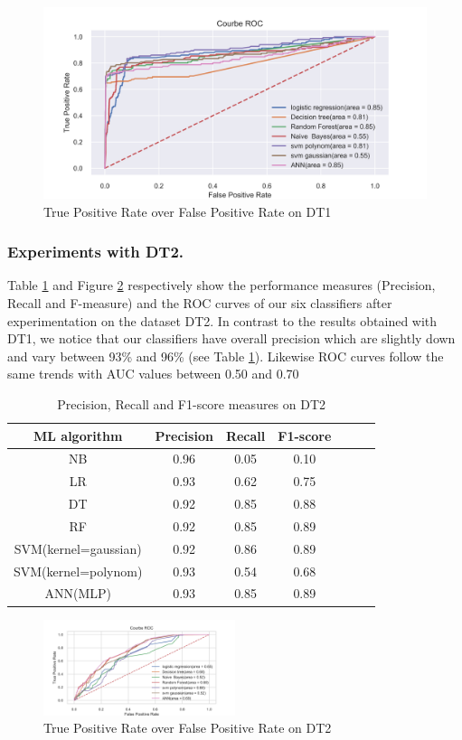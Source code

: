 \begin{figure}[!ht]
\centering
\includegraphics[width=.5\textwidth]{ROCmg}
\caption{True Positive Rate over False Positive Rate on DT1}\label{curve_roc_dt1}
\end{figure}

\subsubsection*{\bf Experiments with DT2.}
Table \ref{perf-measure-dt2} and Figure \ref{curve_roc_dt2} respectively show the performance measures (Precision, Recall and F-measure) and the ROC curves of our six classifiers after experimentation on the dataset DT2. In contrast to the results obtained with DT1, we notice that our classifiers have overall precision which are slightly down and vary between 93\% and 96\% (see Table \ref{perf-measure-dt2}). Likewise ROC curves follow the same trends with AUC values between 0.50 and 0.70

\begin{table}[!ht]
\centering
\begin{tabular}{*{5}{c}l r}
  \toprule
  \textbf{ML algorithm} & \textbf{Precision} & \textbf{Recall} & \textbf{F1-score} \\
   \midrule
  NB &0.96& 0.05  & 0.10 \\
  LR & 0.93& 0.62  & 0.75\\
  DT &0.92 & 0.85&0.88\\
   RF &0.92 &0.85&0.89\\
    SVM(kernel=gaussian) &0.92 &0.86 &0.89\\
    SVM(kernel=polynom) & 0.93&0.54&0.68\\
    ANN(MLP)&0.93&0.85&0.89\\
    \bottomrule
\end{tabular}
\caption{Precision, Recall and F1-score measures on DT2}\label{perf-measure-dt2}
\end{table}
\begin{figure}[!h]
\centering
\includegraphics[width=0.5\textwidth]{ROCdio}
\caption{True Positive Rate over False Positive Rate on DT2}\label{curve_roc_dt2}
\end{figure}

